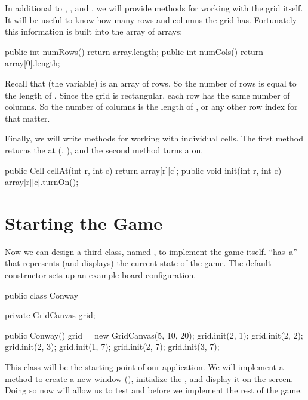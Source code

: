 In additional to , , and , we will provide methods for working with the grid itself.
It will be useful to know how many rows and columns the grid has.
Fortunately this information is built into the array of arrays:

\begin{code}
public int numRows() {
    return array.length;
}
public int numCols() {
    return array[0].length;
}
\end{code}

Recall that  (the variable) is an array of rows.
So the number of rows is equal to the length of .
Since the grid is rectangular, each row has the same number of columns.
So the number of columns is the length of , or any other row index for that matter.

Finally, we will write methods for working with individual cells.
The first method returns the  at (, ), and the second method turns a  on.

\begin{code}
public Cell cellAt(int r, int c) {
    return array[r][c];
}
public void init(int r, int c) {
    array[r][c].turnOn();
}
\end{code}


\section{Starting the Game}

Now we can design a third class, named , to implement the game itself.
 ``has~a''  that represents (and displays) the current state of the game.
The default constructor sets up an example board configuration.

\begin{code}
public class Conway {
    private GridCanvas grid;

    public Conway() {
        grid = new GridCanvas(5, 10, 20);
        grid.init(2, 1);
        grid.init(2, 2);
        grid.init(2, 3);
        grid.init(1, 7);
        grid.init(2, 7);
        grid.init(3, 7);
    }
}
\end{code}

This class will be the starting point of our application.
We will implement a  method to create a new window (), initialize the , and display it on the screen.
Doing so now will allow us to test  and  before we implement the rest of the game.

